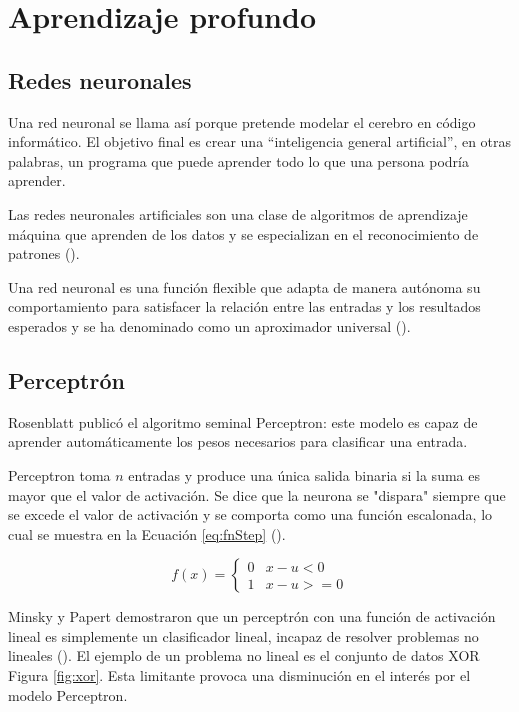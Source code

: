 \section{Aprendizaje profundo}

\subsection{Redes neuronales}

Una red neuronal se llama así porque pretende modelar el cerebro en código informático. El objetivo final es crear una “inteligencia general artificial”, en otras palabras, un programa que puede aprender todo lo que una persona podría aprender.

Las redes neuronales artificiales son una clase de algoritmos de aprendizaje máquina que aprenden de los datos y se especializan en el reconocimiento de patrones (\cite{rosebrock2017deep}).

Una red neuronal es una función flexible que adapta de manera autónoma su comportamiento para satisfacer la relación entre las entradas y los resultados esperados y se ha denominado como un aproximador universal (\cite{goyal2018Deep}).

\subsection{Perceptrón}

Rosenblatt publicó el algoritmo seminal Perceptron: este modelo es capaz de aprender automáticamente los pesos necesarios para clasificar una entrada.

Perceptron toma $n$ entradas y produce una única salida binaria si la suma es mayor que el valor de activación. Se dice que la neurona se "dispara" siempre que se excede el valor de activación y se comporta como una función escalonada, lo cual se muestra en la Ecuación \ref{eq:fnStep} (\cite{goyal2018Deep}).

\begin{equation}
\label{eq:fnStep}
    f\left(x\right)=\begin{cases}0 & x -u < 0\\1 & x -u >= 0\end{cases}
\end{equation}



Minsky y Papert demostraron que un perceptrón con una función de activación lineal es simplemente un clasificador lineal, incapaz de resolver problemas no lineales (\cite{rosebrock2017deep}). El ejemplo de un problema no lineal es el conjunto de datos XOR Figura \ref{fig:xor}. Esta limitante provoca una disminución en el interés por el modelo Perceptron.

